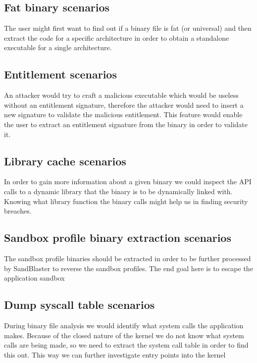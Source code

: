 
\subsection{Fat binary scenarios}

The user might first want to find out if a binary file is fat (or universal)
and then extract the code for a specific architecture in order to obtain a
standalone executable for a single architecture.

\subsection{Entitlement scenarios}

An attacker would try to craft a malicious executable which would be useless
without an entitlement signature, therefore the attacker would need to insert
a new signature to validate the malicious entitlement. This feature would
enable the user to extract an entitlement signature from the binary in order
to validate it.

\subsection{Library cache scenarios}

In order to gain more information about a given binary we could inspect the
API calls to a dynamic library that the binary is to be dynamically linked
with. Knowing what library function the binary calls might help us in finding
security breaches.

\subsection{Sandbox profile binary extraction scenarios}

The sandbox profile binaries should be extracted in order to be further
processed by SandBlaster to reverse the sandbox profiles. The end goal here is
to escape the application sandbox

\subsection{Dump syscall table scenarios}

During binary file analysis we would identify what system calls the
application makes. Because of the closed nature of the kernel we do not know
what system calls are being made, so we need to extract the system call table
in order to find this out. This way we can further investigate entry points
into the kernel

